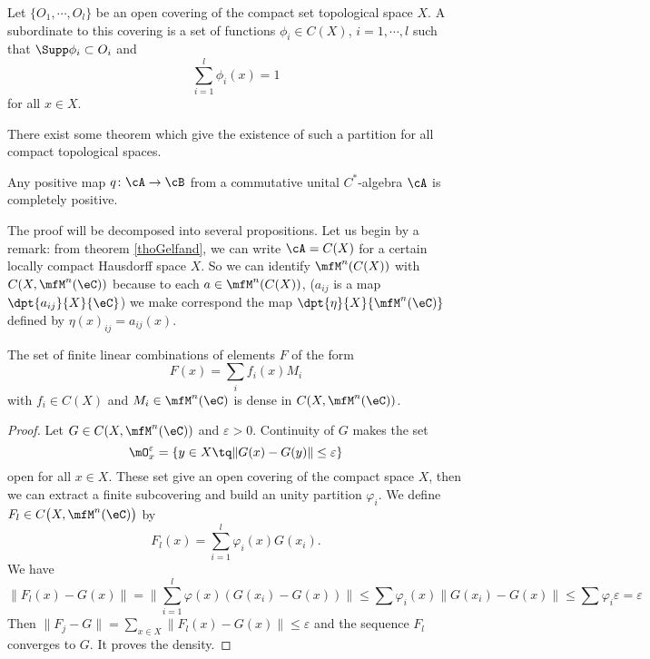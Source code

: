 \begin{definition}
Let $\{ O_1,\cdots,O_l \}$ be an open covering of the compact set topological space $X$. A  subordinate to this covering is a set of functions $\phi_i\in C(X)$, $i=1,\cdots,l$ such that $\Supp\phi_i\subset O_i$ and
\[ 
  \sum_{i=1}^l\phi_i(x)=1
\]
for all $x\in X$.

\end{definition}
There exist some theorem which give the existence of such a partition for all compact topological spaces.


\begin{proposition}
Any positive map $q\colon \cA\to \cB$ from a commutative unital $C^*$-algebra $\cA$ is completely positive.
\end{proposition}

The proof will be decomposed into several propositions. Let us begin by a remark: from theorem \ref{thoGelfand}, we can write $\cA=C(X)$ for a certain locally compact Hausdorff space $X$. So we can identify $\mfM^n(C(X))$ with $C(X,\mfM^n(\eC))$ because to each $a\in\mfM^n(C(X))$, ($a_{ij}$ is a map $\dpt{ a_{ij} }{ X }{ \eC }$) we make correspond the map $\dpt{ \eta }{ X }{ \mfM^n(\eC) }$ defined by $\eta(x)_{ij}=a_{ij}(x)$.


\begin{proposition}
The set of finite linear combinations of elements $F$ of the form
\[ 
  F(x)=\sum_i f_i(x)M_i
\]
with $f_i\in C(X)$ and $M_i\in\mfM^n(\eC)$ is dense in $C(X,\mfM^n(\eC))$.
 \label{prop:lencombpart}
\end{proposition}


\begin{proof}
Let $G\in C(X,\mfM^n(\eC))$ and $\varepsilon>0$. Continuity of $G$ makes the set
\[ 
  \mO_x^{\varepsilon}=\{ y\in X\tq \| G(x)-G(y) \|\leq\varepsilon \}
\]
open for all $x\in X$. These set give an open covering of the compact space $X$, then we can extract a finite subcovering and build an unity partition $\varphi_i$. We define $F_l\in C\big( X,\mfM^n(\eC) \big)$ by
\begin{equation} \label{eq:Fllim}
  F_l(x)=\sum_{i=1}^l\varphi_i(x)G(x_i).
\end{equation}
We have
\begin{equation}
\| F_l(x)-G(x) \|=\| \sum_{i=1}^l\varphi(x)( G(x_i)-G(x) ) \|
        \leq \sum \varphi_i(x)\| G(x_i)-G(x) \|
        \leq \sum\varphi_i\varepsilon
    =\varepsilon
\end{equation}
Then $\| F_j-G \|=\sum_{x\in X}\| F_l(x)-G(x) \|\leq\varepsilon$ and the sequence $F_l$ converges to $G$. It proves the density.
\end{proof}


